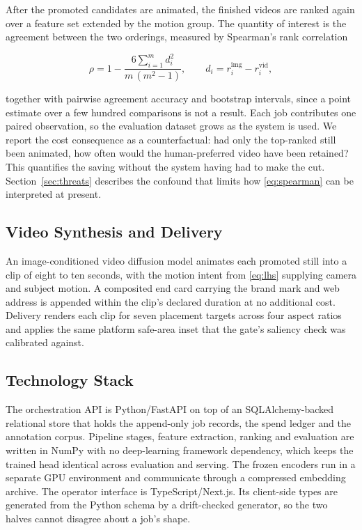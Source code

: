 \documentclass[conference]{IEEEtran}
\begin{document}
After the promoted candidates are animated, the finished videos are ranked again
over a feature set extended by the motion group. The quantity of interest is the
agreement between the two orderings, measured by Spearman's rank correlation

\begin{equation}
\rho = 1 - \frac{6 \sum_{i=1}^{m} d_i^2}{m\,(m^2-1)},
\qquad d_i = r^{\text{img}}_i - r^{\text{vid}}_i ,
\label{eq:spearman}
\end{equation}

together with pairwise agreement accuracy and bootstrap intervals, since a point
estimate over a few hundred comparisons is not a result. Each job contributes one
paired observation, so the evaluation dataset grows as the system is used. We report
the cost consequence as a counterfactual: had only the top-ranked still been
animated, how often would the human-preferred video have been retained? This
quantifies the saving without the system having had to make the cut.
Section~\ref{sec:threats} describes the confound that limits how \eqref{eq:spearman}
can be interpreted at present.

\subsection{Video Synthesis and Delivery}

An image-conditioned video diffusion model \cite{ho2022vdm,blattmann2023svd}
animates each promoted still into a clip of eight to ten seconds, with the motion
intent from \eqref{eq:lhs} supplying camera and subject motion. A composited end
card carrying the brand mark and web address is appended within the clip's declared
duration at no additional cost. Delivery renders each clip for seven placement
targets across four aspect ratios and applies the same platform safe-area inset that
the gate's saliency check was calibrated against.

\subsection{Technology Stack}
\label{sec:stack}

The orchestration API is Python/FastAPI on top of an SQLAlchemy-backed relational
store that holds the append-only job records, the spend ledger and the annotation
corpus. Pipeline stages, feature extraction, ranking and evaluation are written in
NumPy with no deep-learning framework dependency, which keeps the trained head
identical across evaluation and serving. The frozen encoders run in a separate GPU
environment and communicate through a compressed embedding archive. The operator
interface is TypeScript/Next.js. Its client-side types are generated from the Python
schema by a drift-checked generator, so the two halves cannot disagree about a job's
shape.
\end{document}
